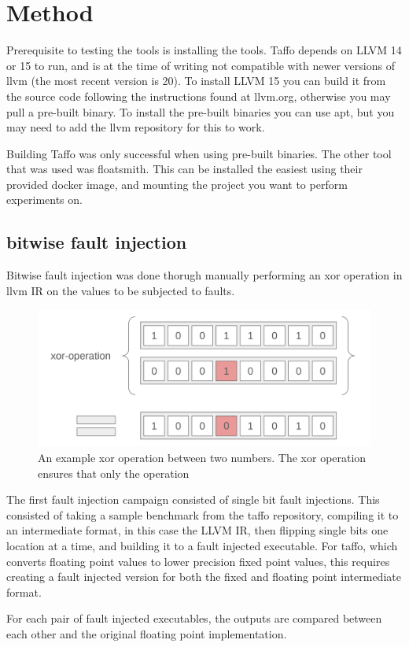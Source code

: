 \section{Method}
Prerequisite to testing the tools is installing the tools. Taffo depends on LLVM 14 or 15 to run, and is at the time of writing not compatible with newer versions of llvm (the most recent version is 20). To install LLVM 15 you can build it from the source code following the instructions found at llvm.org, otherwise you may pull a pre-built binary. To install the pre-built binaries you can use apt, but you may need to add the llvm repository for this to work. 

Building Taffo was only successful when using pre-built binaries. 
The other tool that was used was floatsmith. This can be installed the easiest using their provided docker image, and mounting the project you want to perform experiments on.

\subsection{bitwise fault injection}
Bitwise fault injection was done thorugh manually performing an xor operation in llvm IR on the values to be subjected to faults.

\begin{figure}[h!]
    \centering
    \includegraphics[width=0.5\linewidth]{Images/xor_operation.png}
    \caption{An example xor operation between two numbers. The xor operation ensures that only the operation }
    \label{fig:xor_operation}
\end{figure}

The first fault injection campaign consisted of single bit fault injections. This consisted of taking a sample benchmark from the taffo repository, compiling it to an intermediate format, in this case the LLVM IR, then flipping single bits one location at a time, and building it to a fault injected executable. For taffo, which converts floating point values to lower precision fixed point values, this requires creating a fault injected version for both the fixed and floating point intermediate format.

For each pair of fault injected executables, the outputs are compared between each other and the original floating point implementation.

